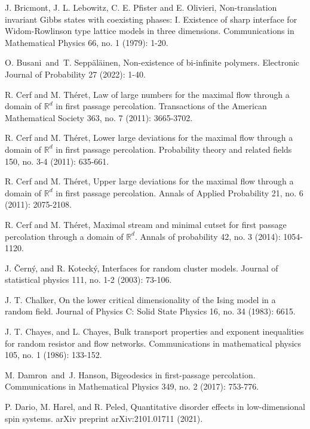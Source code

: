 \documentclass[11pt, reqno]{amsart}
\numberwithin{equation}{section}
\begin{document}
\begin{thebibliography}{}
J. Bricmont, J. L. Lebowitz, C. E. Pfister and E. Olivieri, Non-translation invariant Gibbs states with coexisting phases: I. Existence of sharp interface for Widom-Rowlinson type lattice models in three dimensions. Communications in Mathematical Physics 66, no. 1 (1979): 1-20.

O. Busani\ and\ T. Sepp\"al\"ainen, Non-existence of bi-infinite polymers. Electronic Journal of Probability 27 (2022): 1-40.

R. Cerf and M. Th\'eret, Law of large numbers for the maximal flow through a domain of $\mathbb{R}^d$ in first passage percolation. Transactions of the American Mathematical Society 363, no. 7 (2011): 3665-3702.

R. Cerf and M. Th\'eret, Lower large deviations for the maximal flow through a domain of $\mathbb{R}^d$ in first passage percolation. Probability theory and related fields 150, no. 3-4 (2011): 635-661.

R. Cerf and M. Th\'eret, Upper large deviations for the maximal flow through a domain of $\mathbb{R}^d$ in first passage percolation. Annals of Applied Probability 21, no. 6 (2011): 2075-2108.

R. Cerf and M. Th\'eret, Maximal stream and minimal cutset for first passage percolation through a domain of $\mathbb{R}^d$. Annals of probability 42, no. 3 (2014): 1054-1120.

J. \v{C}ern\'y, and R. Koteck\'y, Interfaces for random cluster models. Journal of statistical physics 111, no. 1-2 (2003): 73-106.

J. T. Chalker, On the lower critical dimensionality of the Ising model in a random field. Journal of Physics C: Solid State Physics 16, no. 34 (1983): 6615.

J. T. Chayes, and L. Chayes, Bulk transport properties and exponent inequalities for random resistor and flow networks. Communications in mathematical physics 105, no. 1 (1986): 133-152.

M. Damron\ and\ J. Hanson, Bigeodesics in first-passage percolation. Communications in Mathematical Physics 349, no. 2 (2017): 753-776.

P. Dario, M. Harel, and R. Peled, Quantitative disorder effects in low-dimensional spin systems. arXiv preprint arXiv:2101.01711 (2021).


\end{thebibliography}
\end{document}
